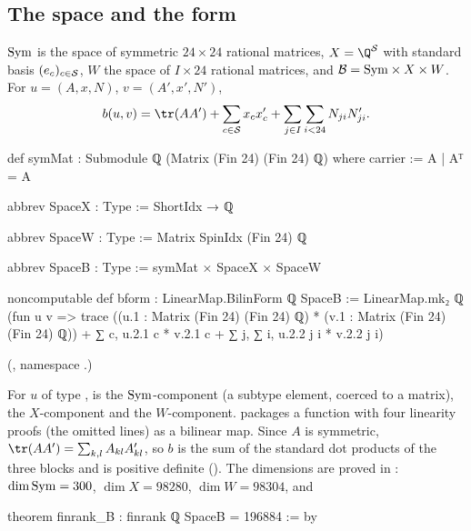 \subsection{The space and the form}

\begin{definition}\label{ch21:def:spaceB}
$\mathrm{Sym}$ is the space of symmetric $24\times24$ rational matrices, $X=\Q^{\chXXIS}$ with standard basis
$(e_c)_{c\in\mathcal{S}}$, $W$ the space of $I\times24$ rational matrices, and
$\mathcal{B}=\mathrm{Sym}\times X\times W$.  For $u=(A,x,N)$, $v=(A',x',N')$,
\begin{equation*}
  b(u,v)=\tr(AA')+\sum_{c\in\chXXIS}x_cx'_c+\sum_{j\in I}\sum_{i<24}N_{ji}N'_{ji}.
\end{equation*}
\end{definition}
\begin{leancode}
def symMat : Submodule ℚ (Matrix (Fin 24) (Fin 24) ℚ) where
  carrier := {A | Aᵀ = A}
\end{leancode}
\begin{leancode}
abbrev SpaceX : Type := ShortIdx → ℚ

abbrev SpaceW : Type := Matrix SpinIdx (Fin 24) ℚ

abbrev SpaceB : Type := symMat × SpaceX × SpaceW
\end{leancode}
\begin{leancode}
noncomputable def bform : LinearMap.BilinForm ℚ SpaceB :=
  LinearMap.mk₂ ℚ (fun u v => trace ((u.1 : Matrix (Fin 24) (Fin 24) ℚ) *
      (v.1 : Matrix (Fin 24) (Fin 24) ℚ)) +
      ∑ c, u.2.1 c * v.2.1 c + ∑ j, ∑ i, u.2.2 j i * v.2.2 j i)
\end{leancode}
(, namespace
.)
\begin{dictionary}
For $u$ of type ,  is the $\mathrm{Sym}$-component (a subtype element, coerced to a
matrix),  the $X$-component and  the $W$-component.  
packages a function with four linearity proofs (the omitted lines) as a bilinear map.  Since $A$ is
symmetric, $\tr(AA')=\sum_{k,l}A_{kl}A'_{kl}$, so $b$ is the sum of the standard dot products of the
three blocks and is positive definite ().  The dimensions are proved in
: $\dim\mathrm{Sym}=300$, $\dim X=98280$, $\dim W=98304$, and
\end{dictionary}
\begin{leancode}
theorem finrank_B : finrank ℚ SpaceB = 196884 := by
\end{leancode}
